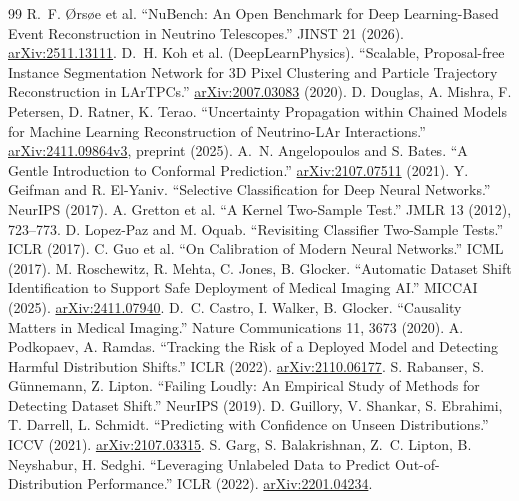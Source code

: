 \documentclass[10pt,twocolumn]{extarticle}
\begin{document}
\begin{thebibliography}{99}
\scriptsize
\setlength{\itemsep}{-1.6pt}\setlength{\parsep}{0pt}
 R.~F. \O rs\o e et al. ``NuBench: An Open Benchmark for Deep
Learning-Based Event Reconstruction in Neutrino Telescopes.'' JINST 21 (2026).
\href{https://arxiv.org/abs/2511.13111}{arXiv:2511.13111}.
 D.~H. Koh et al. (DeepLearnPhysics). ``Scalable,
Proposal-free Instance Segmentation Network for 3D Pixel Clustering and
Particle Trajectory Reconstruction in LArTPCs.''
\href{https://arxiv.org/abs/2007.03083}{arXiv:2007.03083} (2020).
 D. Douglas, A. Mishra, F. Petersen, D. Ratner,
K. Terao. ``Uncertainty Propagation within Chained Models for Machine Learning
Reconstruction of Neutrino-LAr Interactions.''
\href{https://arxiv.org/abs/2411.09864}{arXiv:2411.09864v3}, preprint (2025).
 A.~N. Angelopoulos and S. Bates. ``A Gentle
Introduction to Conformal Prediction.''
\href{https://arxiv.org/abs/2107.07511}{arXiv:2107.07511} (2021).
 Y. Geifman and R. El-Yaniv. ``Selective Classification
for Deep Neural Networks.'' NeurIPS (2017).
 A. Gretton et al. ``A Kernel Two-Sample Test.'' JMLR 13
(2012), 723--773.
 D. Lopez-Paz and M. Oquab. ``Revisiting Classifier
Two-Sample Tests.'' ICLR (2017).
 C. Guo et al. ``On Calibration of Modern Neural Networks.''
ICML (2017).
 M. Roschewitz, R. Mehta, C. Jones, B. Glocker.
``Automatic Dataset Shift Identification to Support Safe Deployment of Medical
Imaging AI.'' MICCAI (2025).
\href{https://arxiv.org/abs/2411.07940}{arXiv:2411.07940}.
 D.~C. Castro, I. Walker, B. Glocker. ``Causality Matters
in Medical Imaging.'' Nature Communications 11, 3673 (2020).
 A. Podkopaev, A. Ramdas. ``Tracking the Risk of a
Deployed Model and Detecting Harmful Distribution Shifts.'' ICLR (2022).
\href{https://arxiv.org/abs/2110.06177}{arXiv:2110.06177}.
 S. Rabanser, S. G\"unnemann, Z. Lipton. ``Failing
Loudly: An Empirical Study of Methods for Detecting Dataset Shift.'' NeurIPS
(2019).
 D. Guillory, V. Shankar, S. Ebrahimi, T. Darrell,
L. Schmidt. ``Predicting with Confidence on Unseen Distributions.'' ICCV
(2021). \href{https://arxiv.org/abs/2107.03315}{arXiv:2107.03315}.
 S. Garg, S. Balakrishnan, Z.~C. Lipton, B. Neyshabur,
H. Sedghi. ``Leveraging Unlabeled Data to Predict Out-of-Distribution
Performance.'' ICLR (2022).
\href{https://arxiv.org/abs/2201.04234}{arXiv:2201.04234}.

\end{thebibliography}
\end{document}
